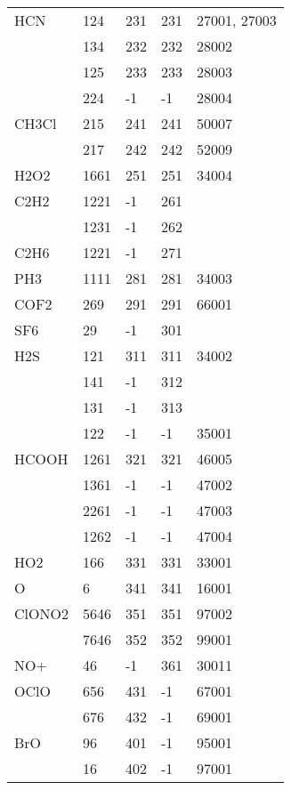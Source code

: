\begin{longtable}{lllll}
\hline                  
  HCN& 124&  231&   231&  27001, 27003\\
     & 134&  232&   232&  28002\\
     & 125&  233&   233&  28003\\
     & 224&  -1&    -1&  28004\\
\hline                  
  CH3Cl& 215&  241&   241&  50007\\
       & 217&  242&   242&  52009\\
\hline                  
  H2O2& 1661&  251&   251&  34004\\
\hline                  
  C2H2& 1221&  -1&   261&\\
      & 1231&  -1&   262&\\
\hline                  
  C2H6& 1221&  -1&   271&\\
\hline
  PH3& 1111&  281&   281&  34003\\
\hline                  
  COF2&  269&  291&   291&  66001\\
\hline                  
  SF6& 29&  -1&   301&\\
\hline                  
  H2S& 121&  311&   311&  34002\\
     & 141&  -1&   312&\\
     & 131&  -1&   313&\\
     & 122&  -1&    -1&  35001\\
\hline                  
  HCOOH& 1261&  321&   321&  46005\\
       & 1361&  -1&    -1&  47002\\
       & 2261&  -1&    -1&  47003\\
       & 1262&  -1&    -1&  47004\\
\hline                  
  HO2& 166&  331&   331&  33001\\
\hline                  
  O& 6&  341&   341&  16001\\
\hline                  
  ClONO2& 5646&  351&   351&  97002\\
        & 7646&  352&   352&  99001\\
\hline                  
  NO+& 46&  -1&   361&  30011\\
\hline                  
  OClO& 656&  431&    -1&  67001\\
      & 676&  432&    -1&  69001\\
\hline                  
  BrO& 96&  401&    -1&  95001\\
     & 16&  402&    -1&  97001\\
\hline                  

\end{longtable}
